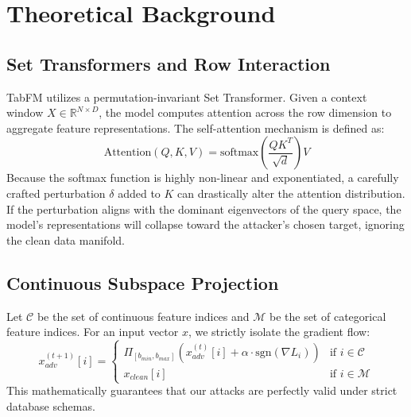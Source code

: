 \section{Theoretical Background}
\subsection{Set Transformers and Row Interaction}
TabFM utilizes a permutation-invariant Set Transformer. Given a context window $X \in \mathbb{R}^{N \times D}$, the model computes attention across the row dimension to aggregate feature representations. The self-attention mechanism is defined as:
\begin{equation}
    \text{Attention}(Q, K, V) = \text{softmax}\left(\frac{QK^T}{\sqrt{d}}\right)V
\end{equation}
Because the softmax function is highly non-linear and exponentiated, a carefully crafted perturbation $\delta$ added to $K$ can drastically alter the attention distribution. If the perturbation aligns with the dominant eigenvectors of the query space, the model's representations will collapse toward the attacker's chosen target, ignoring the clean data manifold.

\subsection{Continuous Subspace Projection}
Let $\mathcal{C}$ be the set of continuous feature indices and $\mathcal{M}$ be the set of categorical feature indices. For an input vector $x$, we strictly isolate the gradient flow:
\begin{equation}
    x_{adv}^{(t+1)}[i] = 
    \begin{cases} 
      \Pi_{[b_{min}, b_{max}]} \left( x_{adv}^{(t)}[i] + \alpha \cdot \text{sgn}(\nabla L_i) \right) & \text{if } i \in \mathcal{C} \\
      x_{clean}[i] & \text{if } i \in \mathcal{M}
    \end{cases}
\end{equation}
This mathematically guarantees that our attacks are perfectly valid under strict database schemas.
